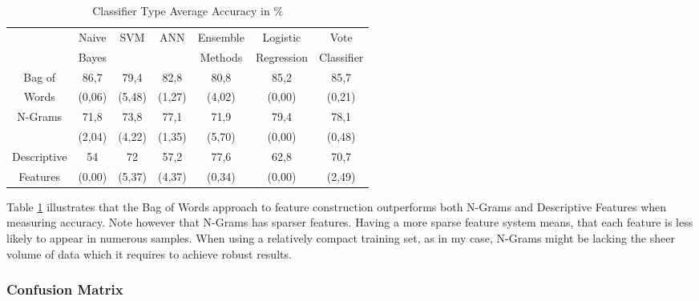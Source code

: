 			\par
			
			\begin{table}[H]
				\centering
				\begin{tabular}{c|cccccc}
					\hline\hline\vspace*{-2mm}
											 & Naive & \multirow{2}{*}{SVM} & \multirow{2}{*}{ANN} & Ensemble & Logistic 	 & Vote \\
											 & Bayes & 					 	&       			   & Methods  & Regression 	 & Classifier \\
					\hline
					Bag of					 & 86,7   & 79,4   & 82,8   & 80,8 	 & 85,2   & 85,7  \\
					Words					 & (0,06) & (5,48) & (1,27) & (4,02) & (0,00) & (0,21) \\
					\hline
					\multirow{2}{*}{N-Grams} & 71,8   & 73,8   & 77,1 	& 71,9 	 & 79,4   & 78,1 \\
											 & (2,04) & (4,22) & (1,35) & (5,70) & (0,00) & (0,48)\\	
					\hline
					Descriptive				 & 54 	  & 72 	   & 57,2   & 77,6   & 62,8   &  70,7\\
					Features 				 & (0,00) & (5,37) & (4,37) & (0,34) & (0,00) & (2,49)\\	
					\hline\hline				
				\end{tabular}
				\caption{Classifier Type Average Accuracy in \%}
				\label{tab:accuracy}%
			\end{table}%
		
		Table \ref{tab:accuracy} illustrates that the Bag of Words approach to feature construction outperforms both N-Grams and Descriptive Features when measuring accuracy. Note however that N-Grams has sparser features. Having a more sparse feature system means, that each feature is less likely to appear in numerous samples. When using a relatively compact training set, as in my case, N-Grams might be lacking the sheer volume of data which it requires to achieve robust results.
		
		\subsubsection{Confusion Matrix}
		
